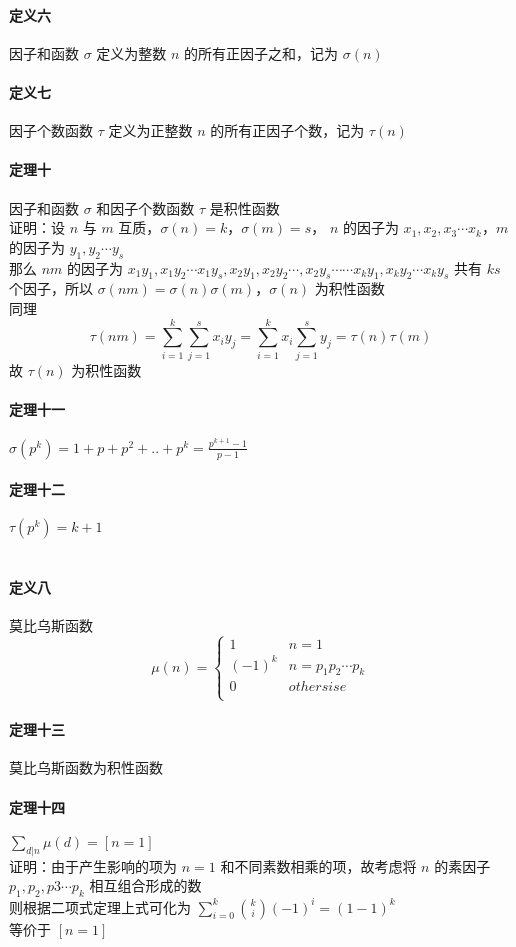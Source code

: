 	\paragraph{定义六}因子和函数 $\sigma$ 定义为整数 $n$ 的所有正因子之和，记为 $\sigma(n)$
	\paragraph{定义七}因子个数函数 $\tau$ 定义为正整数 $n$ 的所有正因子个数，记为 $\tau(n)$
	\paragraph{定理十}因子和函数 $\sigma$ 和因子个数函数 $\tau$ 是积性函数\\
	证明：设 $n$ 与 $m$ 互质，$\sigma(n)=k$，$\sigma(m)=s$， $n$ 的因子为 $x_1,x_2,x_3\cdots x_k$，$m$ 的因子为 $y_1,y_2\cdots y_s$\\
	那么 $nm$ 的因子为 $x_1y_1,x_1y_2\cdots x_1y_s,x_2y_1,x_2y_2\cdots,x_2y_s\cdots \cdots x_ky_1,x_ky_2\cdots x_ky_s$ 共有 $ks$ 个因子，所以 $\sigma(nm)=\sigma(n)\sigma(m)$，$\sigma(n)$ 为积性函数\\
	同理
	$$
	\tau(nm)=\sum_{i=1}^{k}\sum_{j=1}^{s}x_iy_j=\sum_{i=1}^{k}x_i\sum_{j=1}^{s}y_j=\tau(n)\tau(m)
	$$
	故 $\tau(n)$ 为积性函数
	\paragraph{定理十一} $\displaystyle \sigma(p^k)=1+p+p^2+..+p^k=\frac{p^{k+1}-1}{p-1}$
	\paragraph{定理十二} $\displaystyle \tau(p^k)=k+1$\\
	~\\
	\paragraph{定义八}莫比乌斯函数
	$$
	\mu(n)=\left\lbrace
	\begin{matrix}
	1&n=1\\
	(-1)^k&n=p_1p_2\cdots p_k\\
	0&othersise\\
	\end{matrix}
	\right.
	$$
	\paragraph{定理十三}莫比乌斯函数为积性函数
	\paragraph{定理十四} $\displaystyle \sum_{d|n}\mu(d)=[n=1]$\\
	证明：由于产生影响的项为 $n=1$ 和不同素数相乘的项，故考虑将 $n$ 的素因子 $p_1,p_2,p3\cdots p_k$ 相互组合形成的数\\
 	则根据二项式定理上式可化为 $\sum_{i=0}^{k}\binom{k}{i}(-1)^i=(1-1)^k$\\
 	等价于 $[n=1]$
